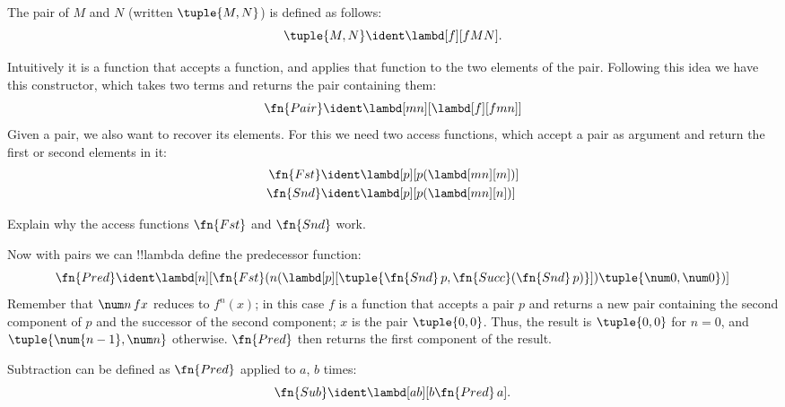 \documentclass[../../../include/open-logic-section]{subfiles}
\begin{document}

\begin{defn}
The pair of $M$ and $N$ (written $\tuple{M,N}$) is defined as follows:
\[
\tuple{M,N} \ident \lambd[f][fMN].
\]
\end{defn}
  
Intuitively it is a function that accepts a function, and applies that
function to the two elements of the pair. Following this idea we have
this constructor, which takes two terms and returns the pair containing
them:
\[
  \fn{Pair} \ident \lambd[mn][\lambd[f][fmn]]
\]
Given a pair, we also want to recover its elements.
For this we need two access functions, which accept a pair as argument and
return the first or second elements in it:
\begin{align*}
  \fn{Fst} & \ident \lambd[p][p(\lambd[mn][m])]\\
  \fn{Snd} & \ident \lambd[p][p(\lambd[mn][n])]
\end{align*}

\begin{prob}
  Explain why the access functions $\fn{Fst}$ and $\fn{Snd}$ work.
\end{prob}

Now with pairs we can !!{lambda define} the predecessor function:
\[
  \fn{Pred} \ident \lambd[n][\fn{Fst}(n (\lambd[p][\tuple{\fn{Snd}\, {p}, \fn{Succ}(\fn{Snd}\, {p})}]) \tuple{\num 0, \num 0})]
\]
Remember that $\num n\, f x$ reduces to $f^{n}(x)$; in this
case $f$ is a function that accepts a pair $p$ and returns a new
pair containing the second component of $p$ and the successor of the
second component; $x$ is the pair $\tuple{0,0}$. Thus, the
result is $\tuple{0,0}$ for $n=0$, and $\tuple{\num{n-1}, \num n}$
otherwise. $\fn{Pred}$ then returns the first component of the result.

Subtraction can be defined as $\fn{Pred}$ applied to $a$, $b$ times:
\[
\fn{Sub} \ident \lambd[ab][b \fn{Pred}\, a].
\]
    
\end{document}
